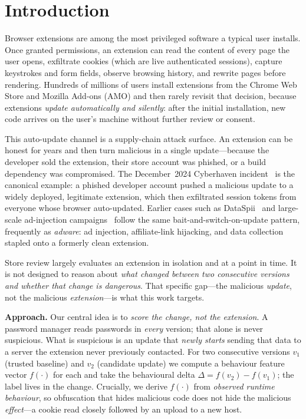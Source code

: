 \documentclass[conference]{IEEEtran}
\begin{document}
\section{Introduction}
Browser extensions are among the most privileged software a typical user installs. Once granted
permissions, an extension can read the content of every page the user opens, exfiltrate cookies
(which are live authenticated sessions), capture keystrokes and form fields, observe browsing
history, and rewrite pages before rendering. Hundreds of millions of users install extensions
from the Chrome Web Store and Mozilla Add-ons (AMO) and then rarely revisit that decision,
because extensions \emph{update automatically and silently}: after the initial installation, new
code arrives on the user's machine without further review or consent.

This auto-update channel is a supply-chain attack surface. An extension can be honest for years
and then turn malicious in a single update---because the developer sold the extension, their
store account was phished, or a build dependency was compromised. The December~2024 Cyberhaven
incident~\cite{cyberhaven} is the canonical example: a phished developer account pushed a
malicious update to a widely deployed, legitimate extension, which then exfiltrated session
tokens from everyone whose browser auto-updated. Earlier cases such as
DataSpii~\cite{dataspii} and large-scale ad-injection campaigns~\cite{palant} follow the same
bait-and-switch-on-update pattern, frequently as \emph{adware}: ad injection, affiliate-link
hijacking, and data collection stapled onto a formerly clean extension.

Store review largely evaluates an extension in isolation and at a point in time. It is not
designed to reason about \emph{what changed between two consecutive versions and whether that
change is dangerous}. That specific gap---the malicious \emph{update}, not the malicious
\emph{extension}---is what this work targets.

\noindent\textbf{Approach.} Our central idea is to \emph{score the change, not the extension}. A
password manager reads passwords in \emph{every} version; that alone is never suspicious. What is
suspicious is an update that \emph{newly starts} sending that data to a server the extension
never previously contacted. For two consecutive versions $v_1$ (trusted baseline) and $v_2$
(candidate update) we compute a behaviour feature vector $f(\cdot)$ for each and take the
behavioural delta $\Delta = f(v_2) - f(v_1)$; the label lives in the change. Crucially, we derive
$f(\cdot)$ from \emph{observed runtime behaviour}, so obfuscation that hides malicious code does
not hide the malicious \emph{effect}---a cookie read closely followed by an upload to a new host.
\end{document}
